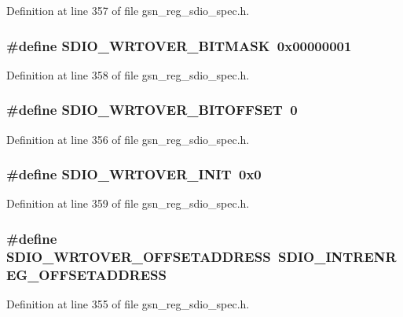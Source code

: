 Definition at line 357 of file gsn\_\-reg\_\-sdio\_\-spec.h.

\hypertarget{a00571_ab1aa2ce8a82f3e2042cc8dcb4bfbc29a}{
\subsubsection[{SDIO\_\-WRTOVER\_\-BITMASK}]{\setlength{\rightskip}{0pt plus 5cm}\#define SDIO\_\-WRTOVER\_\-BITMASK~0x00000001}}
\label{a00571_ab1aa2ce8a82f3e2042cc8dcb4bfbc29a}


Definition at line 358 of file gsn\_\-reg\_\-sdio\_\-spec.h.

\hypertarget{a00571_a9404a2594c30cf67ccecdf2f1994be02}{
\subsubsection[{SDIO\_\-WRTOVER\_\-BITOFFSET}]{\setlength{\rightskip}{0pt plus 5cm}\#define SDIO\_\-WRTOVER\_\-BITOFFSET~0}}
\label{a00571_a9404a2594c30cf67ccecdf2f1994be02}


Definition at line 356 of file gsn\_\-reg\_\-sdio\_\-spec.h.

\hypertarget{a00571_a534c6f8f156767d2bcbb1cb753191ac8}{
\subsubsection[{SDIO\_\-WRTOVER\_\-INIT}]{\setlength{\rightskip}{0pt plus 5cm}\#define SDIO\_\-WRTOVER\_\-INIT~0x0}}
\label{a00571_a534c6f8f156767d2bcbb1cb753191ac8}


Definition at line 359 of file gsn\_\-reg\_\-sdio\_\-spec.h.

\hypertarget{a00571_ab93f47f1a7fb0e2e2701c1ae82040e51}{
\subsubsection[{SDIO\_\-WRTOVER\_\-OFFSETADDRESS}]{\setlength{\rightskip}{0pt plus 5cm}\#define SDIO\_\-WRTOVER\_\-OFFSETADDRESS~SDIO\_\-INTRENREG\_\-OFFSETADDRESS}}
\label{a00571_ab93f47f1a7fb0e2e2701c1ae82040e51}


Definition at line 355 of file gsn\_\-reg\_\-sdio\_\-spec.h.


